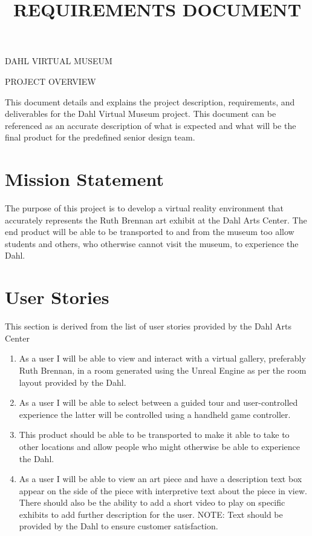 \documentclass[11pt]{article}
\title{REQUIREMENTS DOCUMENT}
\begin{document}
{\Large \bf 
\centerline{DAHL VIRTUAL MUSEUM}\centerline{PROJECT OVERVIEW}
}
\vspace{\baselineskip}

This document details and explains the project description, requirements, and deliverables for the Dahl Virtual Museum project.  This document can be referenced as an accurate description of what is expected and what will be the final product for the predefined senior design team.

\section{Mission Statement}
The purpose of this project is to develop a virtual reality environment that accurately represents the Ruth Brennan art exhibit at the Dahl Arts Center.  The end product will be able to be transported to and from the museum too allow students and others, who otherwise cannot visit the museum, to experience the Dahl.

\section{User Stories}
This section is derived from the list of user stories provided by the Dahl Arts Center

\begin{enumerate}
\item As a user I will be able to view and interact with a virtual gallery, preferably Ruth Brennan, in a room generated using the Unreal Engine as per the room layout provided by the Dahl.

\item As a user I will be able to select between a guided tour and user-controlled experience the latter will be controlled using a handheld game controller.

\item This product should be able to be transported to make it able to take to other locations and allow people who might otherwise be able to experience the Dahl.

\item As a user I will be able to view an art piece and have a description text box appear on the side of the piece with interpretive text about the piece in view.  There should also be the ability to add a short video to play on specific exhibits to add further description for the user. NOTE: Text should be provided by the Dahl to ensure customer satisfaction.

\end{enumerate}
\end{document}
